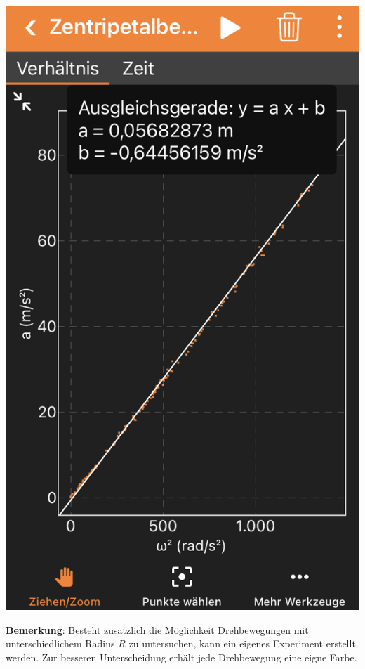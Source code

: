 \documentclass[../main.tex]{subfiles}
\begin{document}
\begin{tcolorbox}
\begin{minipage}[]{0.22\textwidth}
        \vspace{0.3cm}
        \includegraphics[width=\textwidth]{img/app2}
    \end{minipage}

    \vspace{0.7cm}
    \begin{minipage}[]{0.80\textwidth}
        \textbf{Bemerkung}: Besteht zusätzlich die Möglichkeit Drehbewegungen mit unterschiedlichem Radius $R$ zu untersuchen, kann ein eigenes Experiment erstellt werden. Zur besseren Unterscheidung erhält jede Drehbewegung eine eigne Farbe.


\end{minipage}
\end{tcolorbox}
\end{document}
